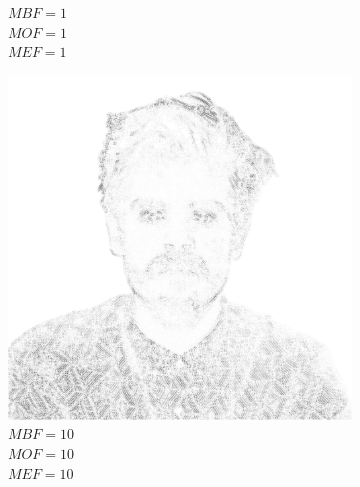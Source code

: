 \documentclass[a4paper, 12pt, polish, twoside]{extreport}
\begin{document}
\begin{figure}[H]
\begin{subfigure}{0.32\textwidth}
        \caption{\(MBF = 1\) \\ \(MOF = 1\) \\ \(MEF = 1\)}
        \label{mine-param-taco-b}
    \end{subfigure}
    \begin{subfigure}{0.32\textwidth}
        \centering
        \includegraphics[width = \textwidth]{img/4-mine/taco-mask/taco_mask_c20_inv0_bg10_obj10_ed10.png}
        \caption{\(MBF = 10\) \\ \(MOF = 10\) \\ \(MEF = 10\)}
        \label{mine-param-taco-c}
    \end{subfigure}\\
    \begin{subfigure}{0.32\textwidth}
        \centering

\end{subfigure}
\end{figure}
\end{document}
